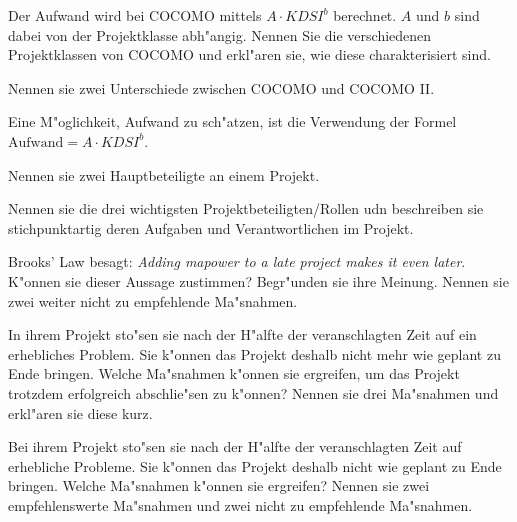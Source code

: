 \documentclass[12pt]{exam}
\begin{document}
\begin{questions}
\addpoints

\question[4.5] Der Aufwand wird bei COCOMO mittels $A \cdot KDSI^b$ berechnet. $A$ und $b$ sind dabei von der Projektklasse abh"angig. Nennen Sie die verschiedenen Projektklassen von COCOMO und erkl"aren sie, wie diese charakterisiert sind.
\addpoints

\question[2] Nennen sie zwei Unterschiede zwischen COCOMO und COCOMO II.
\addpoints

\question[3] Eine M"oglichkeit, Aufwand zu sch"atzen, ist die Verwendung der Formel $\text{Aufwand} = A \cdot KDSI^b$.
\noaddpoints
{}
\addpoints

\question[2] Nennen sie zwei Hauptbeteiligte an einem Projekt.
\addpoints

\question[4.5] Nennen sie die drei wichtigsten Projektbeteiligten/Rollen udn beschreiben sie stichpunktartig deren Aufgaben und Verantwortlichen im Projekt.
\addpoints

\question[4] Brooks' Law besagt: \emph{Adding mapower to a late project makes it even later}. K"onnen sie dieser Aussage zustimmen? Begr"unden sie ihre Meinung. Nennen sie zwei weiter nicht zu empfehlende Ma"snahmen.
\addpoints

\question[6] In ihrem Projekt sto"sen sie nach der H"alfte der veranschlagten Zeit auf ein erhebliches Problem. Sie k"onnen das Projekt deshalb nicht mehr wie geplant zu Ende bringen. Welche Ma"snahmen k"onnen sie ergreifen, um das Projekt trotzdem erfolgreich abschlie"sen zu k"onnen? Nennen sie drei Ma"snahmen und erkl"aren sie diese kurz.
\addpoints

\question[4] Bei ihrem Projekt sto"sen sie nach der H"alfte der veranschlagten Zeit auf erhebliche Probleme. Sie k"onnen das Projekt deshalb nicht wie geplant zu Ende bringen. Welche Ma"snahmen k"onnen sie ergreifen? Nennen sie zwei empfehlenswerte Ma"snahmen und zwei nicht zu empfehlende Ma"snahmen.
\addpoints


\end{questions}
\end{document}
